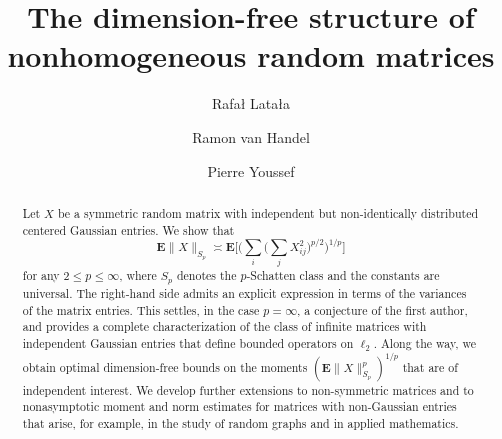 \documentclass[10pt,reqno]{amsart}
\theoremstyle{definition}
\numberwithin{equation}{section}
\numberwithin{figure}{section}
\numberwithin{table}{section}
\begin{document}
\title[Nonhomogeneous random matrices]{The dimension-free structure of \\
nonhomogeneous random matrices}

\author{Rafa{\l} Lata{\l}a}
\address{Institute of Mathematics, University of Warsaw, Banacha 2, 
02-097, Warsaw, Poland}

\author{Ramon van Handel}
\address{Fine Hall 207, Princeton University, Princeton, NJ 
08544, USA}

\author{Pierre Youssef}
\address{Laboratoire de Probabilit\'es, Statistique et Mod\'elisation,
Universit\'e Paris-Diderot, 5 rue Thomas Mann, 75205, Paris CEDEX 13,   
France}

\begin{abstract}
Let $X$ be a symmetric random matrix with independent but non-identically
distributed centered Gaussian entries. We show that 
$$
        \mathbf{E}\|X\|_{S_p} \asymp
        \mathbf{E}\Bigg[
        \Bigg(\sum_i\Bigg(\sum_j X_{ij}^2\Bigg)^{p/2}\Bigg)^{1/p}
        \Bigg]
$$
for any $2\le p\le\infty$, where $S_p$ denotes the $p$-Schatten class and 
the constants are universal. 
The right-hand side admits an explicit expression in terms of the 
variances of the matrix entries. This settles, in the case $p=\infty$, a 
conjecture of the first author, and provides a complete 
characterization of the class of infinite matrices with 
independent Gaussian entries that define bounded operators on $\ell_2$.  
Along the way, we obtain optimal dimension-free bounds on the moments 
$(\mathbf{E}\|X\|_{S_p}^p)^{1/p}$ that are of independent interest.
We develop further extensions to non-symmetric matrices and to
nonasymptotic moment and norm estimates for matrices with non-Gaussian 
entries that arise, for example, in the study of random graphs and
in applied mathematics.
\end{abstract}



\maketitle
\end{document}
